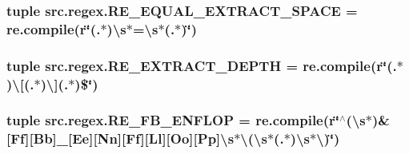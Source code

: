 \hypertarget{namespacesrc_1_1regex_af819a98bbdc42520bdb567e879887969}{
\subsubsection[{R\-E\-\_\-\-E\-Q\-U\-A\-L\-\_\-\-E\-X\-T\-R\-A\-C\-T\-\_\-\-S\-P\-A\-C\-E}]{\setlength{\rightskip}{0pt plus 5cm}tuple src.\-regex.\-R\-E\-\_\-\-E\-Q\-U\-A\-L\-\_\-\-E\-X\-T\-R\-A\-C\-T\-\_\-\-S\-P\-A\-C\-E = re.\-compile(r\char`\"{}(.$\ast$)\textbackslash{}s$\ast$=\textbackslash{}s$\ast$(.$\ast$)\char`\"{})}}\label{namespacesrc_1_1regex_af819a98bbdc42520bdb567e879887969}
\hypertarget{namespacesrc_1_1regex_a3c7a6afd9cf2804f061f0bed11a0c77d}{
\subsubsection[{R\-E\-\_\-\-E\-X\-T\-R\-A\-C\-T\-\_\-\-D\-E\-P\-T\-H}]{\setlength{\rightskip}{0pt plus 5cm}tuple src.\-regex.\-R\-E\-\_\-\-E\-X\-T\-R\-A\-C\-T\-\_\-\-D\-E\-P\-T\-H = re.\-compile(r\char`\"{}(.$\ast$)\textbackslash{}\mbox{[}(.$\ast$)\textbackslash{}\mbox{]}(.$\ast$)\$\char`\"{})}}\label{namespacesrc_1_1regex_a3c7a6afd9cf2804f061f0bed11a0c77d}
\hypertarget{namespacesrc_1_1regex_ad6f3a1c01ad772aacfe1ae26a93297e1}{
\subsubsection[{R\-E\-\_\-\-F\-B\-\_\-\-E\-N\-F\-L\-O\-P}]{\setlength{\rightskip}{0pt plus 5cm}tuple src.\-regex.\-R\-E\-\_\-\-F\-B\-\_\-\-E\-N\-F\-L\-O\-P = re.\-compile(r\char`\"{}$^\wedge$(\textbackslash{}s$\ast$)\&\mbox{[}Ff\mbox{]}\mbox{[}Bb\mbox{]}\-\_\-\mbox{[}Ee\mbox{]}\mbox{[}Nn\mbox{]}\mbox{[}Ff\mbox{]}\mbox{[}Ll\mbox{]}\mbox{[}Oo\mbox{]}\mbox{[}Pp\mbox{]}\textbackslash{}s$\ast$\textbackslash{}(\textbackslash{}s$\ast$(.$\ast$)\textbackslash{}s$\ast$\textbackslash{})\char`\"{})}}\label{namespacesrc_1_1regex_ad6f3a1c01ad772aacfe1ae26a93297e1}
